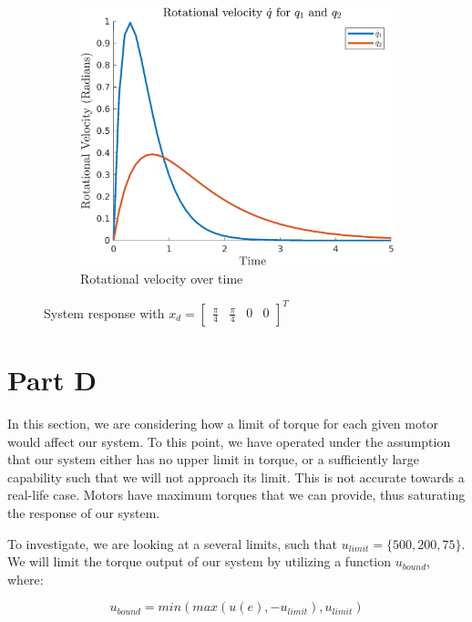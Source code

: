 \documentclass{article}
\begin{document}
\begin{figure}[H]
    \begin{subfigure}{0.325\textwidth}
        \centering
        \includegraphics[width = \textwidth]{figures/rotational-velocity-c3.png}
        \caption{Rotational velocity over time}
    \end{subfigure}
    \caption{System response with $x_d=\begin{bmatrix} \frac{\pi}{4} & \frac{\pi}{4} & 0 & 0 \end{bmatrix}^T$}
    \label{fig:c-3_results}
\end{figure}

\section*{Part D}

In this section, we are considering how a limit of torque for each given motor would affect our system. To this point, we have operated under the assumption that our system either has no upper limit in torque, or a sufficiently large capability such that we will not approach its limit. This is not accurate towards a real-life case. Motors have maximum torques that we can provide, thus saturating the response of our system.

To investigate, we are looking at a several limits, such that $u_{limit} = \{ 500, 200, 75 \}$. We will limit the torque output of our system by utilizing a function $u_{bound}$, where:

\begin{equation}
    u_{bound} = min( max(u(e), -u_{limit}), u_{limit})
\end{equation}
\end{document}
